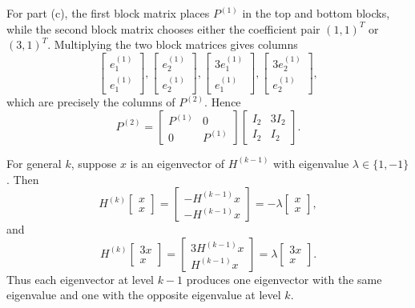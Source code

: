 \documentclass[12pt]{article}
\begin{document}
For part (c), the first block matrix places $P^{(1)}$ in the top and bottom blocks, while the second block matrix chooses either the coefficient pair $(1,1)^T$ or $(3,1)^T$. Multiplying the two block matrices gives columns
\[
\begin{bmatrix}e_1^{(1)}\\e_1^{(1)}\end{bmatrix},
\begin{bmatrix}e_2^{(1)}\\e_2^{(1)}\end{bmatrix},
\begin{bmatrix}3e_1^{(1)}\\e_1^{(1)}\end{bmatrix},
\begin{bmatrix}3e_2^{(1)}\\e_2^{(1)}\end{bmatrix},
\]
which are precisely the columns of $P^{(2)}$. Hence
\[
\boxed{P^{(2)}=\begin{bmatrix}P^{(1)}&0\\0&P^{(1)}\end{bmatrix}
\begin{bmatrix}I_2&3I_2\\I_2&I_2\end{bmatrix}.}
\]

For general $k$, suppose $x$ is an eigenvector of $H^{(k-1)}$ with eigenvalue $\lambda\in\{1,-1\}$. Then
\[
H^{(k)}\begin{bmatrix}x\\x\end{bmatrix}
=\begin{bmatrix}-H^{(k-1)}x\\-H^{(k-1)}x\end{bmatrix}
=-\lambda\begin{bmatrix}x\\x\end{bmatrix},
\]
and
\[
H^{(k)}\begin{bmatrix}3x\\x\end{bmatrix}
=\begin{bmatrix}3H^{(k-1)}x\\H^{(k-1)}x\end{bmatrix}
=\lambda\begin{bmatrix}3x\\x\end{bmatrix}.
\]
Thus each eigenvector at level $k-1$ produces one eigenvector with the same eigenvalue and one with the opposite eigenvalue at level $k$.
\end{document}

